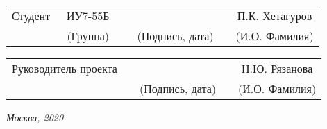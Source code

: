 \vspace{1cm}
\noindent
\begin{tabular}{l c c c c c}
    Студент      & ~ИУ7-55Б~       & \hspace{2.5cm} & \hspace{3.5cm}                 & &  П.К. Хетагуров \\\cline{2-2}\cline{4-4} \cline{6-6} 
    \hspace{3cm} & {\footnotesize(Группа)} &                & {\footnotesize(Подпись, дата)} & & {\footnotesize(И.О. Фамилия)}
\end{tabular}

\vspace{0.5cm}

\noindent
\begin{tabular}{l c c c c}
    Руководитель проекта & \hspace{3.3cm}   & \hspace{3.5cm}              & & Н.Ю. Рязанова \\\cline{3-3} \cline{5-5} 
    \hspace{3cm}  &                & {\footnotesize(Подпись, дата)} & & {\footnotesize(И.О. Фамилия)}
\end{tabular}

\begin{center}	
	\vfill
	\large \textit {Москва, 2020}
\end{center}

\thispagestyle {empty}
\pagebreak